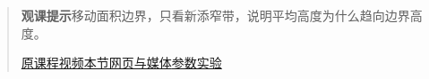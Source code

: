 \begin{quote}\small\textbf{观课提示}\quad 移动面积边界，只看新添窄带，说明平均高度为什么趋向边界高度。

\href{https://www.youtube.com/watch?v=FnJqaIESC2s}{原课程视频}\quad\href{https://vitael04213.github.io/3blue1brown-notes/lessons/area-and-slope.html}{本节网页与媒体}\quad\href{https://vitael04213.github.io/3blue1brown-notes/lab.html\#integral}{参数实验}
\end{quote}

